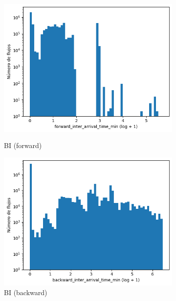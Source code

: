 \begin{figure}[H]
\begin{subfigure}[b]{0.26\textwidth}
        \includegraphics[width=\textwidth]{media/packet_pincer_botiot/forward_inter_arrival_time_min_log_x_log_y.png}
        \caption{BI (forward)}
        \includegraphics[width=\textwidth]{media/packet_pincer_botiot/backward_inter_arrival_time_min_log_x_log_y.png}
        \caption{BI (backward)}
    \end{subfigure}
    \hfill
    \begin{subfigure}[b]{0.26\textwidth}
        \centering

\end{subfigure}
\end{figure}
